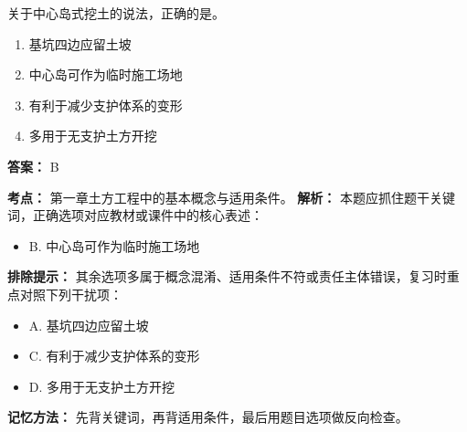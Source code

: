 \documentclass[UTF8,fontset=fandol,11pt]{ctexart}
\begin{document}
\vspace{0.2em}

\begin{quizbox}[title={第 12 题}]
关于中心岛式挖土的说法，正确的是。\\
\begin{enumerate}[label=\Alph*.]
\item 基坑四边应留土坡
\item 中心岛可作为临时施工场地
\item 有利于减少支护体系的变形
\item 多用于无支护土方开挖
\end{enumerate}
\textbf{答案：} B
\vspace{0.25em}
\begin{answerbox}[title={考点解析}]
\textbf{考点：} 第一章土方工程中的基本概念与适用条件。
\textbf{解析：} 本题应抓住题干关键词，正确选项对应教材或课件中的核心表述：
\begin{itemize}
\item B. 中心岛可作为临时施工场地
\end{itemize}
\textbf{排除提示：} 其余选项多属于概念混淆、适用条件不符或责任主体错误，复习时重点对照下列干扰项：
\begin{itemize}
\item A. 基坑四边应留土坡
\item C. 有利于减少支护体系的变形
\item D. 多用于无支护土方开挖
\end{itemize}
\textbf{记忆方法：} 先背关键词，再背适用条件，最后用题目选项做反向检查。
\end{answerbox}
\end{quizbox}

\vspace{0.2em}
\end{document}
